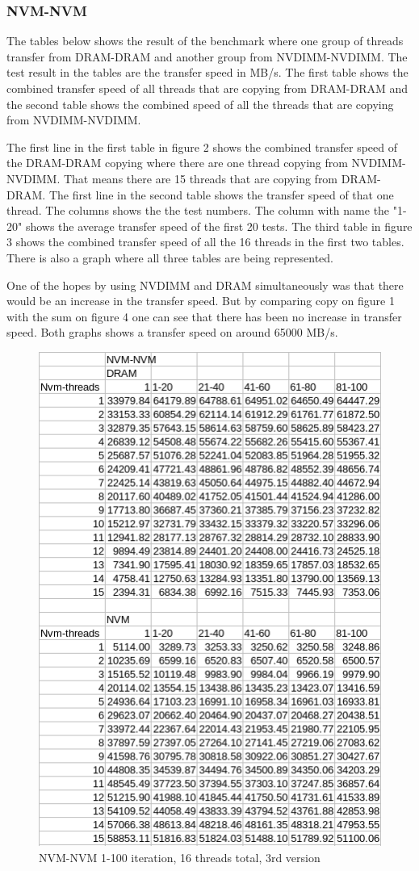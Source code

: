 \documentclass[12pt,a4paper,USenglish]{article}      %
\begin{document}
\subsubsection{NVM-NVM}
The tables below shows the result of the benchmark where one group of threads transfer from DRAM-DRAM and another group from NVDIMM-NVDIMM. The test result in the tables are the transfer speed in MB/s. The first table shows the combined transfer speed of all threads that are copying from DRAM-DRAM and the second table shows the combined speed of all the threads that are copying from NVDIMM-NVDIMM. 

The first line in the first table in figure 2 shows the combined transfer speed of the DRAM-DRAM copying where there are one thread copying from NVDIMM-NVDIMM. That means there are 15 threads that are copying from DRAM-DRAM. 
The first line in the second table shows the transfer speed of that one thread. The columns shows the the test numbers. The column with name the "1-20" shows the average transfer speed of the first 20 tests.
The third table in figure 3 shows the combined transfer speed of all the 16 threads in the first two tables. 
There is also a graph where all three tables are being represented.

One of the hopes by using NVDIMM and DRAM simultaneously was that there would be an increase in the transfer speed. But by comparing copy on figure 1 with the sum on figure 4 one can see that there has been no increase in transfer speed. Both graphs shows a transfer speed on around 65000 MB/s.

\begin{figure}[!hbtp]
\includegraphics[scale=0.7]{NVM-NVM_table_p1_1-100_v3}
\caption{NVM-NVM 1-100 iteration, 16 threads total, 3rd version}
\end{figure}
\end{document}
